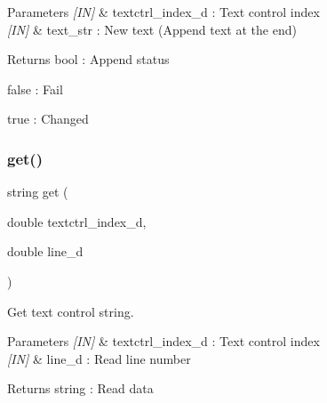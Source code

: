 \begin{DoxyParams}{Parameters}
{\em \mbox{[}\+I\+N\mbox{]}} & textctrl\+\_\+index\+\_\+d \+: Text control index \\
\hline
{\em \mbox{[}\+I\+N\mbox{]}} & text\+\_\+str \+: New text (Append text at the end) \\
\hline
\end{DoxyParams}
\begin{DoxyReturn}{Returns}
bool \+: Append status \begin{DoxyItemize}
\item false \+: Fail \item true \+: Changed \end{DoxyItemize}

\end{DoxyReturn}
\mbox{\label{classtextctrl_ab0cbf2f1d4309c9589b475c2aa27343f}} 
\subsubsection{get()}
{\footnotesize\ttfamily string get (\begin{DoxyParamCaption}\item[{double}]{textctrl\+\_\+index\+\_\+d,  }\item[{double}]{line\+\_\+d }\end{DoxyParamCaption})}



Get text control string. 


\begin{DoxyCode}{0}
\end{DoxyCode}



\begin{DoxyParams}{Parameters}
{\em \mbox{[}\+I\+N\mbox{]}} & textctrl\+\_\+index\+\_\+d \+: Text control index \\
\hline
{\em \mbox{[}\+I\+N\mbox{]}} & line\+\_\+d \+: Read line number \\
\hline
\end{DoxyParams}
\begin{DoxyReturn}{Returns}
string \+: Read data 
\end{DoxyReturn}
\mbox{\label{classtextctrl_a0a55dab1053335fa9470498a38ebb206}} 
